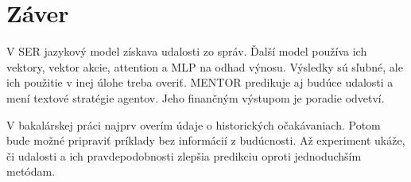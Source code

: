 \section{Záver}
V SER jazykový model získava udalosti zo správ. Ďalší model používa ich vektory, vektor akcie, attention a MLP na odhad výnosu. Výsledky sú sľubné, ale ich použitie v inej úlohe treba overiť. MENTOR predikuje aj budúce udalosti a mení textové stratégie agentov. Jeho finančným výstupom je poradie odvetví.

V bakalárskej práci najprv overím údaje o historických očakávaniach. Potom bude možné pripraviť príklady bez informácií z budúcnosti. Až experiment ukáže, či udalosti a ich pravdepodobnosti zlepšia predikciu oproti jednoduchším metódam.
